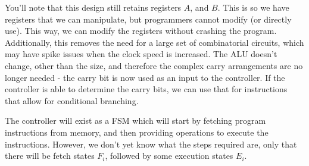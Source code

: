 \documentclass[a4paper, 12pt]{article}
\begin{document}
            You'll note that this design still retains registers $A$, and $B$. This is so we have registers that we can manipulate, but programmers cannot modify (or directly use). This way, we can modify the registers without crashing the program. Additionally, this removes the need for a large set of combinatorial circuits, which may have spike issues when the clock speed is increased. The ALU doesn't change, other than the size, and therefore the complex carry arrangements are no longer needed - the carry bit is now used as an input to the controller. If the controller is able to determine the carry bits, we can use that for instructions that allow for conditional branching.
            \medskip

            The controller will exist as a FSM which will start by fetching program instructions from memory, and then providing operations to execute the instructions. However, we don't yet know what the steps required are, only that there will be fetch states $F_i$, followed by some execution states $E_i$.
            \medskip
\end{document}
